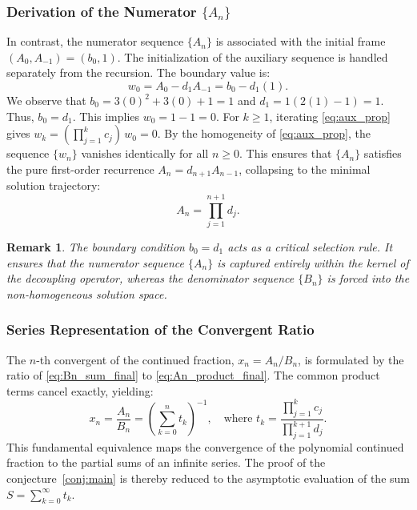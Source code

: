 \documentclass[pdflatex,sn-mathphys-num]{sn-jnl}
\theoremstyle{thmstyleone}
\theoremstyle{thmstyletwo}
\newtheorem{remark}{Remark}
\theoremstyle{thmstylethree}
\begin{document}
	\subsubsection{Derivation of the Numerator $\{A_n\}$}
	In contrast, the numerator sequence $\{A_n\}$ is associated with the initial frame $(A_0, A_{-1}) = (b_0, 1)$. The initialization of the auxiliary sequence is handled separately from the recursion. The boundary value is:
	\begin{equation}
		w_0 = A_0 - d_1 A_{-1} = b_0 - d_1(1).
	\end{equation}
	We observe that $b_0 = 3(0)^2+3(0)+1 = 1$ and $d_1 = 1(2(1)-1) = 1$. Thus, $b_0 = d_1$.
	This implies $w_0 = 1 - 1 = 0$. For $k \ge 1$, iterating \eqref{eq:aux_prop} gives $w_k = (\prod_{j=1}^k c_j)\,w_0 = 0$. By the homogeneity of \eqref{eq:aux_prop}, the sequence $\{w_n\}$ vanishes identically for all $n \ge 0$. This ensures that $\{A_n\}$ satisfies the pure first-order recurrence $A_n = d_{n+1} A_{n-1}$, collapsing to the minimal solution trajectory:
	\begin{equation}\label{eq:An_product_final}
		A_n = \prod_{j=1}^{n+1} d_j.
	\end{equation}
	
	\begin{remark}
		The boundary condition $b_0 = d_1$ acts as a critical selection rule. It ensures that the numerator sequence $\{A_n\}$ is captured entirely within the kernel of the decoupling operator, whereas the denominator sequence $\{B_n\}$ is forced into the non-homogeneous solution space.
	\end{remark}
	
	\subsubsection{Series Representation of the Convergent Ratio}
	The $n$-th convergent of the continued fraction, $x_n = A_n/B_n$, is formulated by the ratio of \eqref{eq:Bn_sum_final} to \eqref{eq:An_product_final}.
	The common product terms cancel exactly, yielding:
	\begin{equation}\label{eq:xn_final}
		x_n = \frac{A_n}{B_n} = \left( \sum_{k=0}^{n} t_k \right)^{-1}, \quad \text{where } t_k = \frac{\prod_{j=1}^{k} c_j}{\prod_{j=1}^{k+1} d_j}.
	\end{equation}
	This fundamental equivalence maps the convergence of the polynomial continued fraction to the partial sums of an infinite series. The proof of the conjecture~\eqref{conj:main} is thereby reduced to the asymptotic evaluation of the sum $S = \sum_{k=0}^{\infty} t_k$.
	
\end{document}
